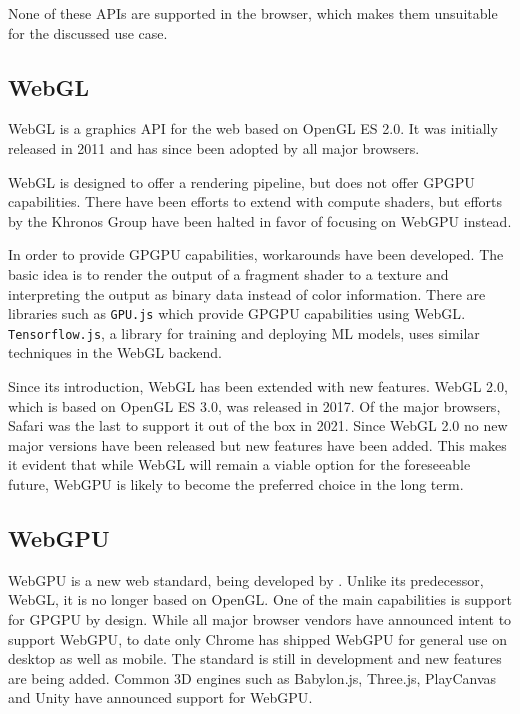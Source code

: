 None of these \glspl{API} are supported in the browser, which makes them unsuitable for the discussed use case.

\subsection*{WebGL}

\gls{WebGL} is a graphics \gls{API} for the web based on \gls{OpenGL ES} 2.0. It was initially released in 2011 and has since been adopted by all major browsers.

\gls{WebGL} is designed to offer a rendering pipeline, but does not offer \gls{GPGPU} capabilities. There have been efforts to extend with compute shaders, but efforts by the \gls{Khronos Group} have been halted in favor of focusing on \gls{WebGPU} instead.

In order to provide \gls{GPGPU} capabilities, workarounds have been developed. The basic idea is to render the output of a fragment shader to a texture and interpreting the output as binary data instead of color information.
There are libraries such as \texttt{GPU.js} which provide \gls{GPGPU} capabilities using \gls{WebGL}. \texttt{Tensorflow.js}, a library for training and deploying \gls{ML} models, uses similar techniques in the \gls{WebGL} backend.

Since its introduction, \gls{WebGL} has been extended with new features. \gls{WebGL} 2.0, which is based on \gls{OpenGL ES} 3.0, was released in 2017. Of the major browsers, Safari was the last to support it out of the box in 2021. Since \gls{WebGL} 2.0 no new major versions have been released but new features have been added. This makes it evident that while \gls{WebGL} will remain a viable option for the foreseeable future, \gls{WebGPU} is likely to become the preferred choice in the long term.

\subsection*{WebGPU}

\gls{WebGPU} is a new web standard, being developed by  \cite{webgpuSpecification}. Unlike its predecessor, \gls{WebGL}, it is no longer based on \gls{OpenGL}. One of the main capabilities is support for \gls{GPGPU} by design. While all major browser vendors have announced intent to support \gls{WebGPU}, to date only Chrome has shipped \gls{WebGPU} for general use on desktop as well as mobile.
The standard is still in development and new features are being added.
Common 3D engines such as \gls{Babylon.js}, \gls{Three.js}, \gls{PlayCanvas} and \gls{Unity} have announced support for \gls{WebGPU}.

